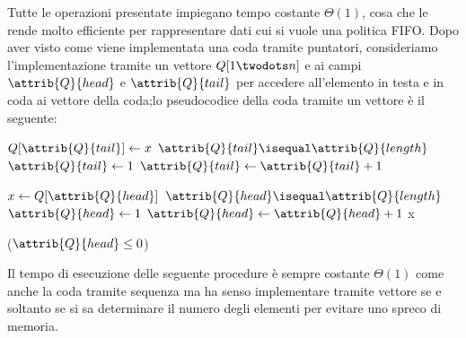 Tutte le operazioni presentate impiegano tempo costante $\Theta(1)$, cosa che le rende molto efficiente per rappresentare dati cui si vuole una politica FIFO.
Dopo aver visto come viene implementata una coda tramite puntatori, consideriamo l'implementazione tramite un vettore $Q[1 \twodots n]$ 
e ai campi $\attrib{Q}{head}$ e $\attrib{Q}{tail}$ per accedere all'elemento in testa e in coda ai vettore della coda;lo pseudocodice della coda tramite un vettore è il seguente:
\begin{codebox}
\li $Q[\attrib{Q}{tail}] \gets x$
\li \If $\attrib{Q}{tail} \isequal \attrib{Q}{length}$
\li    \Then $\attrib{Q}{tail} \gets 1$
\li \Else $\attrib{Q}{tail} \gets \attrib{Q}{tail} + 1$
\end{codebox}

\begin{codebox}
\li $x \gets Q[\attrib{Q}{head}]$
\li \If $\attrib{Q}{head} \isequal \attrib{Q}{length}$
\li \Then $\attrib{Q}{head} \gets 1$
\li \Else $\attrib{Q}{head} \gets \attrib{Q}{head} + 1$
\li \Return x
\end{codebox}

\begin{codebox}
\li \Return ($\attrib{Q}{head} \leq 0$)
\end{codebox}

Il tempo di esecuzione delle seguente procedure è sempre costante $\Theta(1)$
come anche la coda tramite sequenza ma ha senso implementare tramite vettore se e soltanto se
si sa determinare il numero degli elementi per evitare uno spreco di memoria.
